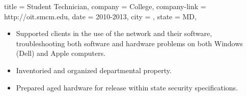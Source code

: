 \begin{position}
  {
    title   = Student Technician,
    company = \StMarys College,%
    company-link = http://oit.smcm.edu,
    date    = 2010-2013,
    city    = \StMarys,
    state   = MD,
  }

\begin{itemize}
\item Supported clients in the use of the network and their software,
  troubleshooting both software and hardware problems on both Windows (Dell) and Apple computers.
\item Inventoried and organized departmental property.
\item Prepared aged hardware for release within state security specifications.
\end{itemize}
\end{position}
